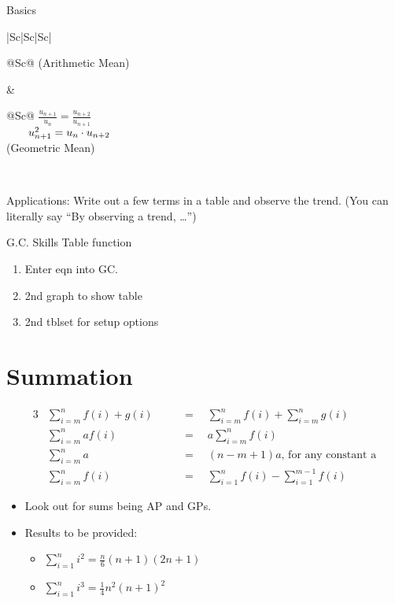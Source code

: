 \documentclass[oneside]{book}
\begin{document}
\begin{stbox}{Basics}{}
\begin{center}
\begin{tabular}{|Sc|Sc|Sc|}
\begin{tabular}{@{}Sc@{}}
      \footnotesize (Arithmetic Mean) \normalsize
    \end{tabular} &
    \begin{tabular}{@{}Sc@{}}
      \(\frac{u_{n+1}}{u_n}=\frac{u_{n+2}}{u_{n+1}}\)\\
      \(\hspace{0.7cm}u_{n+1}^2=u_{n} \cdot u_{n+2}\)\\
      \footnotesize (Geometric Mean) \normalsize
    \end{tabular}\\
    \hline
  \end{tabular}
  \end{center}
\end{stbox}
\begin{IN}
  Applications: Write out a few terms in a table and observe the trend. (You can literally say ``By observing a trend, \ldots'')
\end{IN}
\begin{lbox}[colbacktitle=white, coltitle=black, colframe=black]{G.C. Skills} 
  Table function
  \footnotesize \begin{enumerate}
    \item Enter eqn into GC.
    \item 2nd graph to show table
    \item 2nd tblset for setup options
  \end{enumerate} \normalsize
\end{lbox}
\section{Summation}
\begin{fact}
  \begin{alignat*}{3}
    &\sum_{i=m}^{n}{f(i)+g(i)}\quad& &=\quad \sum_{i=m}^{n}{f(i)}+\sum_{i=m}^{n}{g(i)}\\
    &\sum_{i=m}^{n}{af(i)}& &=\quad a\sum_{i=m}^{n}{f(i)}\\
    &\sum_{i=m}^{n}{a}& &=\quad (n-m+1)a\text{, for any constant a}\\
    &\sum_{i=m}^{n}{f(i)}& &=\quad \sum_{i=1}^{n}{f(i)}-\sum_{i=1}^{m-1}{f(i)} 
  \end{alignat*}
\end{fact}
\begin{note}
  \begin{itemize}
    \item Look out for sums being AP and GPs.
    \item Results to be provided:
    \begin{itemize}
      \item \(\sum_{i=1}^{n}{i^2}=\frac{n}{6}(n+1)(2n+1)\)
      \item \(\sum_{i=1}^{n}{i^3}=\frac{1}{4}n^2(n+1)^2\)
    \end{itemize}
  \end{itemize}
\end{note}
\end{document}
